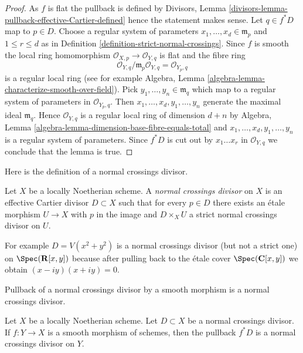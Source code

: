 \begin{proof}
As $f$ is flat the pullback is defined by
Divisors, Lemma \ref{divisors-lemma-pullback-effective-Cartier-defined}
hence the statement makes sense.
Let $q \in f^*D$ map to $p \in D$. Choose a regular system
of parameters $x_1, \ldots, x_d \in \mathfrak m_p$
and $1 \leq r \leq d$ as in
Definition \ref{definition-strict-normal-crossings}.
Since $f$ is smooth the local ring homomorphism
$\mathcal{O}_{X, p} \to \mathcal{O}_{Y, q}$ is flat
and the fibre ring
$$
\mathcal{O}_{Y, q}/\mathfrak m_p \mathcal{O}_{Y, q} =
\mathcal{O}_{Y_p, q}
$$
is a regular local ring (see for example
Algebra, Lemma \ref{algebra-lemma-characterize-smooth-over-field}).
Pick $y_1, \ldots, y_n \in \mathfrak m_q$ which map to a regular
system of parameters in $\mathcal{O}_{Y_p, q}$.
Then $x_1, \ldots, x_d, y_1, \ldots, y_n$ generate the
maximal ideal $\mathfrak m_q$. Hence $\mathcal{O}_{Y, q}$
is a regular local ring of dimension
$d + n$ by Algebra, Lemma \ref{algebra-lemma-dimension-base-fibre-equals-total}
and $x_1, \ldots, x_d, y_1, \ldots, y_n$
is a regular system of parameters. Since $f^*D$ is cut
out by $x_1 \ldots x_r$ in $\mathcal{O}_{Y, q}$ we conclude
that the lemma is true.
\end{proof}

\noindent
Here is the definition of a normal crossings divisor.

\begin{definition}
\label{definition-normal-crossings}
Let $X$ be a locally Noetherian scheme. A {\it normal crossings divisor}
on $X$ is an effective Cartier divisor $D \subset X$ such that for
every $p \in D$ there exists an \'etale morphism $U \to X$ with
$p$ in the image and $D \times_X U$ a
strict normal crossings divisor on $U$.
\end{definition}

\noindent
For example $D = V(x^2 + y^2)$ is a normal crossings divisor
(but not a strict one) on
$\Spec(\mathbf{R}[x, y])$ because after pulling back to
the \'etale cover $\Spec(\mathbf{C}[x, y])$ we obtain $(x - iy)(x + iy) = 0$.

\begin{lemma}
\label{lemma-smooth-pullback-normal-crossings}
\begin{slogan}
Pullback of a normal crossings divisor by a smooth
morphism is a normal crossings divisor.
\end{slogan}
Let $X$ be a locally Noetherian scheme. Let $D \subset X$ be a
normal crossings divisor. If $f : Y \to X$ is a smooth
morphism of schemes, then the pullback $f^*D$ is a
normal crossings divisor on $Y$.
\end{lemma}

